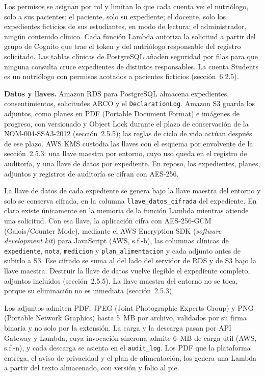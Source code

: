 \documentclass[12pt, a4paper]{article}
\begin{document}
Los permisos se asignan por rol y limitan lo que cada cuenta ve: el nutriólogo, solo a sus pacientes; el paciente, solo su expediente; el docente, solo los expedientes ficticios de sus estudiantes, en modo de lectura; el administrador, ningún contenido clínico. Cada función Lambda autoriza la solicitud a partir del
grupo de Cognito que trae el token y del nutriólogo responsable del
registro solicitado. Las tablas clínicas de PostgreSQL añaden seguridad
por filas para que ninguna consulta cruce expedientes de distintos
responsables. La cuenta Students es un
nutriólogo con permisos acotados a pacientes ficticios (sección~6.2.5).

\textbf{Datos y llaves.} Amazon RDS para PostgreSQL almacena
expedientes, consentimientos, solicitudes ARCO y el
\texttt{DeclarationLog}. Amazon S3 guarda los adjuntos, como planes en
PDF (Portable Document Format) e imágenes de progreso, con versionado y Object Lock durante el
plazo de conservación de la NOM-004-SSA3-2012 (sección~2.5.5); las
reglas de ciclo de vida actúan después de ese plazo. AWS KMS
custodia las llaves con el esquema por envolvente de la
sección~2.5.3: una llave maestra por entorno, cuyo uso queda en el registro de auditoría, y una llave de datos por expediente. En reposo, los expedientes, planes, adjuntos y registros de auditoría se cifran con AES-256.

La llave de datos de cada expediente se genera bajo la llave maestra del
entorno y solo se conserva cifrada, en la columna
\texttt{llave\_datos\_cifrada} del expediente. En claro existe
únicamente en la memoria de la función Lambda mientras atiende una
solicitud. Con esa llave, la aplicación cifra con AES-256-GCM (Galois/Counter Mode), mediante
el AWS Encryption SDK (\textit{software development kit}) para JavaScript (AWS, s.f.-b), las columnas
clínicas de \texttt{expediente}, \texttt{nota}, \texttt{medicion} y
\texttt{plan\_alimentacion} y cada adjunto antes de subirlo a S3. Ese
cifrado se suma al del lado del servidor de RDS y de S3 bajo la llave
maestra. Destruir la llave de datos vuelve ilegible el expediente
completo, adjuntos incluidos (sección~2.5.5). La llave maestra del entorno no se toca, porque su eliminación no es inmediata (sección~2.5.3).

Los adjuntos admiten PDF, JPEG (Joint Photographic Experts Group) y PNG (Portable Network Graphics) hasta 5~MB por archivo, validados
por su firma binaria y no solo por la extensión. La carga y la descarga
pasan por API Gateway y Lambda, cuya invocación síncrona admite 6~MB de
carga útil (AWS, s.f.-n), y cada descarga se asienta en el
\texttt{audit\_log}. Los PDF que la plataforma entrega, el aviso de
privacidad y el plan de alimentación, los genera una Lambda a partir del
texto almacenado, con versión y folio al pie.
\end{document}
